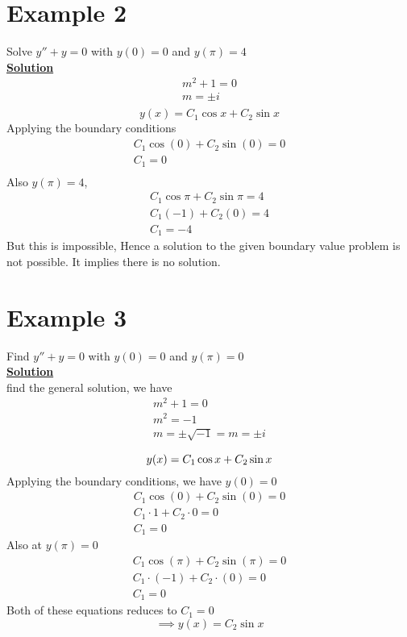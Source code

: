 \documentclass[12pt]{report}
\newcommand{\ubt}[1]{\textbf{\underline{#1}}}
\newcommand{\sps}{\\[0.2cm]}
\newcommand{\dprime}{''}
\begin{document}
	\section*{Example 2}
	Solve $y\dprime + y = 0$ with $y(0) = 0$ and $y(\pi) = 4$\sps
	\ubt{Solution}\sps
	\begin{equation*}
		\begin{array}{c}
			m^2 + 1 = 0\sps
			m = \pm i\sps
		\end{array}
	\end{equation*}
	\begin{equation}
		y(x) = C_1\cos x + C_2\sin x \label{eq:2_6}
	\end{equation}
	Applying the boundary conditions
	\begin{equation*}
		\begin{array}{c}
			C_1\cos(0) + C_2\sin(0) = 0\sps
			C_1 = 0\sps
		\end{array}
	\end{equation*}
	Also $y(\pi) = 4$,
	\begin{equation*}
		\begin{array}{c}
			C_1\cos\pi + C_2\sin\pi = 4\sps
			C_1(-1) + C_2(0) = 4\sps
			C_1 = -4
		\end{array}
	\end{equation*}
	But this is impossible, Hence a solution to the given boundary value problem is not possible. It implies there is no solution.
	\section*{Example 3}
	Find $y\dprime + y = 0$ with $y(0)=0$ and $y(\pi)=0$\sps
	\newpage
	\ubt{Solution}\sps
	find the general solution, we have\\
	\begin{equation*}
		\begin{array}{c}
			m^2 + 1 = 0\sps
			m^2 = -1\sps
			m = \pm\sqrt{-1} = m = \pm i\sps
		\end{array}
	\end{equation*}
	\begin{equation*}
		y(x) = C_1\cos x + C_2\sin x\sps
	\end{equation*}
	Applying the boundary conditions, we have $y(0)=0$
	\begin{equation*}
		\begin{array}{c}
			C_1\cos(0) + C_2\sin(0) = 0\sps
			C_1 \cdot 1 + C_2 \cdot 0 = 0\sps
			C_1 = 0
		\end{array}
	\end{equation*}
	Also at $y(\pi) = 0$
	\begin{equation*}
		\begin{array}{c}
			C_1\cos(\pi) + C_2\sin(\pi) = 0\sps
			C_1 \cdot (-1) + C_2 \cdot (0) = 0\sps
			C_1 = 0
		\end{array}
	\end{equation*}
	Both of these equations reduces to $C_1 =0$
	\begin{equation*}
		\implies y(x) = C_2\sin x
	\end{equation*}
\end{document}
